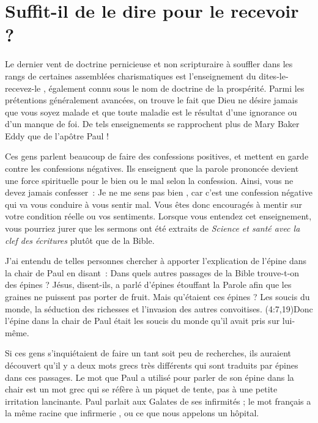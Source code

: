 \section*{Suffit-il de le dire pour le recevoir ?}

Le dernier vent de doctrine pernicieuse et non scripturaire à souffler
 dans les rangs de certaines assemblées charismatiques
 est l'en\-sei\-gne\-ment du \og dites-le-recevez-le \fg{},
 également connu sous le nom de doctrine de la prospérité.
 Parmi les prétentions généralement avancées, on trouve le fait
 que Dieu ne désire jamais que vous soyez malade et que toute maladie
 est le résultat d'une ignorance ou d'un manque de foi.
 De tels enseignements se rapprochent plus de Mary Baker Eddy
 que de l'apôtre Paul !

Ces gens parlent beaucoup de faire des confessions positives,
 et mettent en garde contre les confessions négatives.
 Ils enseignent que la parole prononcée devient une force spirituelle
 pour le bien ou le mal selon la confession.
 Ainsi, vous ne devez jamais confesser~: \og Je ne me sens pas bien \fg{},
 car c'est une confession négative qui va vous conduire à vous sentir mal.
 Vous êtes donc encouragés à mentir sur votre condition réelle
 ou vos sentiments. Lorsque vous entendez cet enseignement,
 vous pourriez jurer que les sermons ont été extraits
 de \emph{Science et santé avec la clef des écritures}
  plutôt que de la Bible.

J'ai entendu de telles personnes chercher à apporter l'explication
 de l'épine dans la chair de Paul en disant~:
 \og Dans quels autres passages de la Bible trouve-t-on des épines ? \fg{}
 \og Jésus, disent-ils, a parlé d'épines étouffant la Parole afin
 que les graines ne puissent pas porter de fruit. \fg{}
 Mais qu'étaient ces épines ? Les soucis du monde,
 la séduction des richesses et l'invasion des autres convoitises.
 (4:7,19)Donc l'épine dans la chair de Paul
 était les soucis du monde qu'il avait pris sur lui-même.

Si ces gens s'inquiétaient de faire un tant soit peu de recherches,
 ils auraient découvert qu'il y a deux mots grecs très différents
 qui sont traduits par \og épines \fg{} dans ces passages.
 Le mot que Paul a utilisé pour parler de son épine dans la chair
 est un mot grec qui se réfère à un piquet de tente,
 pas à une petite irritation lancinante.
 Paul parlait aux Galates de ses infirmités ;
 le mot français a la même racine que \og infirmerie \fg{},
 ou ce que nous appelons un hôpital.

